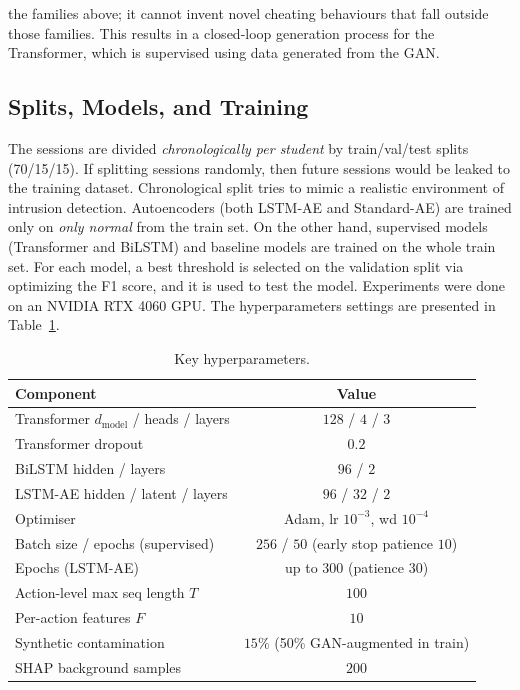 \documentclass[sigconf]{acmart}
\begin{document}
the families above; it cannot invent novel cheating behaviours that fall outside those families. This results in a closed-loop generation process for the Transformer, which is supervised using data generated from the GAN.

\subsection{Splits, Models, and Training}
The sessions are divided \emph{chronologically per student} by train/val/test splits (70/15/15). If splitting sessions randomly, then future sessions would be leaked to the training dataset. Chronological split tries to mimic a realistic environment of intrusion detection. Autoencoders (both LSTM-AE and Standard-AE) are trained only on \emph{only normal} from the train set. On the other hand, supervised models (Transformer and BiLSTM) and baseline models are trained on the whole train set. For each model, a best threshold is selected on the validation split via optimizing the F1 score, and it is used to test the model. Experiments were done on an NVIDIA RTX 4060 GPU. The hyperparameters settings are presented in Table~\ref{tab:hparams}.

\begin{table}[htbp]
\caption{Key hyperparameters.}
\label{tab:hparams}
\centering
\small
\begin{tabular}{lc}
\toprule
\textbf{Component} & \textbf{Value} \\
\midrule
Transformer $d_{\text{model}}$ / heads / layers & $128$ / $4$ / $3$ \\
Transformer dropout & $0.2$ \\
BiLSTM hidden / layers & $96$ / $2$ \\
LSTM-AE hidden / latent / layers & $96$ / $32$ / $2$ \\
Optimiser & Adam, lr $10^{-3}$, wd $10^{-4}$ \\
Batch size / epochs (supervised) & $256$ / $50$ (early stop patience $10$) \\
Epochs (LSTM-AE) & up to $300$ (patience $30$) \\
Action-level max seq length $T$ & $100$ \\
Per-action features $F$ & $10$ \\
Synthetic contamination & $15\%$ (50\% GAN-augmented in train) \\
SHAP background samples & $200$ \\
\bottomrule
\end{tabular}
\end{table}
\end{document}
